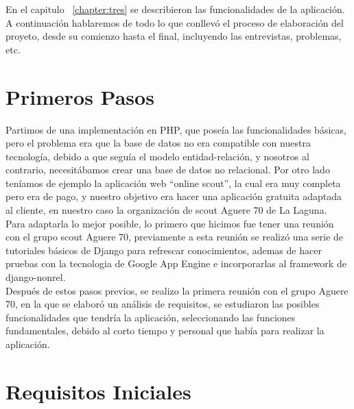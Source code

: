 

En el capitulo ~\ref{chapter:tres} se describieron las funcionalidades de la aplicación. A continuación
hablaremos de todo lo que conllevó el proceso de  elaboración del proyeto, desde su comienzo hasta el final,
incluyendo las entrevistas, problemas, etc.



\section{Primeros Pasos}
\label{4:sec1}

Partimos de una implementación en PHP, que poseía las funcionalidades básicas, pero el problema era que la base de datos
no era compatible con nuestra tecnología, debido a que seguía el modelo entidad-relación, y nosotros al contrario, necesitábamos
crear una base de datos no relacional. Por otro lado teníamos de ejemplo la aplicación web ``online scout'', la cual era muy completa
pero era de pago, y nuestro objetivo era hacer una aplicación gratuita adaptada al cliente, en nuestro caso la organización de scout Aguere 70 de La Laguna.\\

Para adaptarla lo mejor posible, lo primero que hicimos fue tener una reunión con el grupo scout Aguere 70, previamente a esta reunión se realizó una serie de tutoriales
básicos de Django para refrescar conocimientos, ademas de hacer pruebas con la tecnologia de Google App Engine e incorporarlas al framework de django-nonrel.\\ 

Después de estos pasos previos, se realizo la primera reunión con el grupo Aguere 70, en la que se elaboró un análisis de requisitos, se estudiaron las posibles 
funcionalidades que tendría la aplicación, seleccionando las funciones fundamentales, debido al corto tiempo y personal que había para realizar la aplicación.\\

\section{Requisitos Iniciales}
\label{4:sec2}

